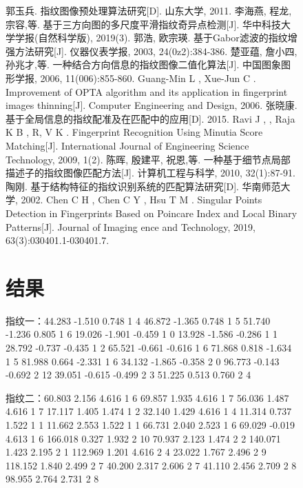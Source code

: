\documentclass{whutmod}
\begin{document}
\begin{spacing}{1.2}
\begin{figure}[H]
\begin{thebibliography}{9}%
	 郭玉兵. 指纹图像预处理算法研究[D]. 山东大学, 2011.
	 李海燕, 程龙, 宗容,等. 基于三方向图的多尺度平滑指纹奇异点检测[J]. 华中科技大学学报(自然科学版), 2019(3).
	 郭浩, 欧宗瑛. 基于Gabor滤波的指纹增强方法研究[J]. 仪器仪表学报, 2003, 24(0z2):384-386.
	  楚亚蕴, 詹小四, 孙兆才,等. 一种结合方向信息的指纹图像二值化算法[J]. 中国图象图形学报, 2006, 11(006):855-860.
    Guang-Min L , Xue-Jun C . Improvement of OPTA algorithm and its application in fingerprint images thinning[J]. Computer Engineering and Design, 2006.
    张晓康. 基于全局信息的指纹配准及在匹配中的应用[D]. 2015.
	Ravi J , , Raja K B , R, V K . Fingerprint Recognition Using Minutia Score Matching[J]. International Journal of Engineering Science Technology, 2009, 1(2).
	陈晖, 殷建平, 祝恩,等. 一种基于细节点局部描述子的指纹图像匹配方法[J]. 计算机工程与科学, 2010, 32(1):87-91.
	陶刚. 基于结构特征的指纹识别系统的匹配算法研究[D]. 华南师范大学, 2002.
	Chen C H , Chen C Y , Hsu T M . Singular Points Detection in Fingerprints Based on Poincare Index and Local Binary Patterns[J]. Journal of Imaging ence and Technology, 2019, 63(3):030401.1-030401.7.

\end{thebibliography} 

\clearpage

\appendix %
\section{结果}
指纹一：44.283 -1.510 0.748 1 4
46.872 -1.365 0.748 1 5
51.740 -1.236 0.805 1 6
19.026 -1.901 -0.459 1 0
13.928 -1.586 -0.286 1 1
28.792 -0.737 -0.435 1 2
65.521 -0.661 -0.616 1 6
71.868 0.818 -1.634 1 5
81.988 0.664 -2.331 1 6
34.132 -1.865 -0.358 2 0
96.773 -0.143 -0.692 2 12
39.051 -0.615 -0.499 2 3
51.225 0.513 0.760 2 4

指纹二：60.803 2.156 4.616 1 6
69.857 1.935 4.616 1 7
56.036 1.487 4.616 1 7
17.117 1.405 1.474 1 2
32.140 1.429 4.616 1 4
11.314 0.737 1.522 1 1
11.662 2.553 1.522 1 1
66.731 2.040 2.523 1 6
69.029 -0.019 4.613 1 6
166.018 0.327 1.932 2 10
70.937 2.123 1.474 2 2
140.071 1.423 2.195 2 1
112.969 1.201 4.616 2 4
23.022 1.767 2.496 2 9
118.152 1.840 2.499 2 7
40.200 2.317 2.606 2 7
41.110 2.456 2.709 2 8
98.955 2.764 2.731 2 8


\end{figure}
\end{spacing}
\end{document}
